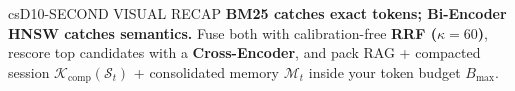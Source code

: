\documentclass[../../../../master.tex]{subfiles}
\begin{document}
\begin{cscolumns}
\begin{cscard}{csD}{10-SECOND VISUAL RECAP}
  \sffamily\footnotesize
  \textbf{BM25 catches exact tokens; Bi-Encoder HNSW catches semantics.}
  Fuse both with calibration-free \textbf{RRF ($\kappa{=}60$)}, rescore top candidates with a \textbf{Cross-Encoder}, and pack RAG + compacted session $\mathcal{K}_{\mathrm{comp}}(\mathcal{S}_t)$ + consolidated memory $\mathcal{M}_t$ inside your token budget $B_{\max}$.
\end{cscard}
\end{cscolumns}

\csend
\end{document}
